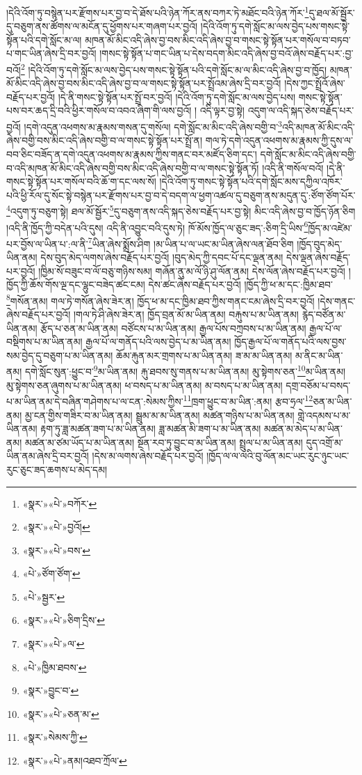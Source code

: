 །དེའི་འོག་ཏུ་བསྙེན་པར་རྫོགས་པར་བྱ་བ་དེ་ཐོས་པའི་ཉེན་ཀོར་ནས་བཀར་ཏེ་མཐོང་བའི་ཉེན་ཀོར་\footnote{«སྣར་»«པེ་»བཀོར་}དུ་ཐལ་མོ་སྦྱོར་དུ་བཅུག་ནས་ཚོགས་ལ་མངོན་དུ་ཕྱོགས་པར་གཞག་པར་བྱའོ། །དེའི་འོག་ཏུ་དགེ་སློང་མ་ལས་བྱེད་པས་གསང་སྟེ་སྟོན་པའི་དགེ་སློང་མ་ལ། མཁན་མོ་མིང་འདི་ཞེས་བྱ་བས་མིང་འདི་ཞེས་བྱ་བ་གསང་སྟེ་སྟོན་པར་གསོལ་བ་བཏབ་པ་གང་ཡིན་ཞེས་དྲི་བར་བྱའོ། །གསང་སྟེ་སྟོན་པ་གང་ཡིན་པ་དེས་བདག་མིང་འདི་ཞེས་བྱ་བའོ་ཞེས་བརྗོད་པར་:བྱ་བའོ།\footnote{«སྣར་»«པེ་»བྱའོ།} །དེའི་འོག་ཏུ་དགེ་སློང་མ་ལས་བྱེད་པས་གསང་སྟེ་སྟོན་པའི་དགེ་སློང་མ་ལ་མིང་འདི་ཞེས་བྱ་བ་ཁྱོད། མཁན་མོ་མིང་འདི་ཞེས་བྱ་བས་མིང་འདི་ཞེས་བྱ་བ་ལ་གསང་སྟེ་སྟོན་པར་སྤྲོའམ་ཞེས་དྲི་བར་བྱའོ། །དེས་ཀྱང་སྤྲོའོ་ཞེས་བརྗོད་པར་བྱའོ། །དེ་ནི་གསང་སྟེ་སྟོན་པར་སྤྲོ་བར་བྱའོ། །དེའི་འོག་ཏུ་དགེ་སློང་མ་ལས་བྱེད་པས། གསང་སྟེ་སྟོན་པས་བར་ཆད་དྲི་བའི་ཕྱིར་གསོལ་བ་འབའ་ཞིག་གི་ལས་བྱའོ། །
འདི་ལྟར་བྱ་སྟེ། འདུག་ལ་འདི་སྐད་ཅེས་བརྗོད་པར་བྱའོ། །དགེ་འདུན་འཕགས་མ་རྣམས་གསན་དུ་གསོལ། དགེ་སློང་མ་མིང་འདི་ཞེས་བགྱི་བ་\footnote{«སྣར་»«པེ་»བས་}འདི་མཁན་མོ་མིང་འདི་ཞེས་བགྱི་བས་མིང་འདི་ཞེས་བགྱི་བ་ལ་གསང་སྟེ་སྟོན་པར་སྤྲོ་ན། གལ་ཏེ་དགེ་འདུན་འཕགས་མ་རྣམས་ཀྱི་དུས་ལ་བབ་ཅིང་བཟོད་ན་དགེ་འདུན་འཕགས་མ་རྣམས་ཀྱིས་གནང་བར་མཛོད་ཅིག་དང་། དགེ་སློང་མ་མིང་འདི་ཞེས་བགྱི་བ་འདི་མཁན་མོ་མིང་འདི་ཞེས་བགྱི་བས་མིང་འདི་ཞེས་བགྱི་བ་ལ་གསང་སྟེ་སྟོན་ཏོ། །འདི་ནི་གསོལ་བའོ། །དེ་ནི་གསང་སྟེ་སྟོན་པར་གསོལ་བའི་ཆོ་ག་དང་ལས་སོ། །དེའི་འོག་ཏུ་གསང་སྟེ་སྟོན་པའི་དགེ་སློང་མས་དཀྱིལ་འཁོར་པའི་ཕྱི་རོལ་དུ་སོང་སྟེ་བསྙེན་པར་རྫོགས་པར་བྱ་བ་དེ་བདག་ལ་ཕྱག་འཚལ་དུ་བཅུག་ནས་མདུན་དུ་:ཙོག་ཙོག་པོར་\footnote{«པེ་»ཙོག་ཙོག་}འདུག་ཏུ་བཅུག་སྟེ། ཐལ་མོ་སྦྱོར་\footnote{«པེ་»སྦྱར་}དུ་བཅུག་ནས་འདི་སྐད་ཅེས་བརྗོད་པར་བྱ་སྟེ། མིང་འདི་ཞེས་བྱ་བ་ཁྱོད་ཉོན་ཅིག །འདི་ནི་ཁྱོད་ཀྱི་བདེན་པའི་དུས། འདི་ནི་འབྱུང་བའི་དུས་ཏེ། ཁོ་མོས་ཁྱོད་ལ་ཅུང་ཟད་:ཅིག་དྲི་ཡིས་\footnote{«སྣར་»«པེ་»ཅིག་དྲིས་}ཁྱོད་མ་འཛེམ་པར་བྱོས་ལ་ཡིན་པ་:ལ་ནི་\footnote{«སྣར་»«པེ་»ལ་}ཡིན་ཞེས་སྨྲོས་ཤིག །མ་ཡིན་པ་ལ་ཡང་མ་ཡིན་ཞེས་ལན་ཐོབ་ཅིག །ཁྱོད་བུད་མེད་ཡིན་ནམ། དེས་བུད་མེད་ལགས་ཞེས་བརྗོད་པར་བྱའོ། །བུད་མེད་ཀྱི་དབང་པོ་དང་ལྡན་ནམ། དེས་ལྡན་ཞེས་བརྗོད་པར་བྱའོ། །ཁྱིམ་སོ་བཟུང་བ་ལོ་བཅུ་གཉིས་སམ། གཞོན་ནུ་མ་ལོ་ཉི་ཤུ་ལོན་ནམ། དེས་ལོན་ཞེས་བརྗོད་པར་བྱའོ། །ཁྱོད་ཀྱི་ཆོས་གོས་ལྔ་དང་ལྷུང་བཟེད་ཚང་ངམ། དེས་ཚང་ཞེས་བརྗོད་པར་བྱའོ། །ཁྱོད་ཀྱི་ཕ་མ་དང་:ཁྱིམ་ཐབ་\footnote{«པེ་»ཁྱིམ་ཐབས་}གསོན་ནམ། གལ་ཏེ་གསོན་ཞེས་ཟེར་ན། ཁྱོད་ཕ་མ་དང་ཁྱིམ་ཐབ་ཀྱིས་གནང་ངམ་ཞེས་དྲི་བར་བྱའོ། །དེས་གནང་ཞེས་བརྗོད་པར་བྱའོ། །གལ་ཏེ་ཤི་ཞེས་ཟེར་ན། ཁྱོད་བྲན་མོ་མ་ཡིན་ནམ། བརྐུས་པ་མ་ཡིན་ནམ། རྙེད་བཙོན་མ་ཡིན་ནམ། རྩོད་པ་ཅན་མ་ཡིན་ནམ། བཙོངས་པ་མ་ཡིན་ནམ། རྒྱལ་པོས་བཀྲབས་པ་མ་ཡིན་ནམ། རྒྱལ་པོ་ལ་བསྡིགས་པ་མ་ཡིན་ནམ། རྒྱལ་པོ་ལ་གནོད་པའི་ལས་བྱེད་པ་མ་ཡིན་ནམ། ཁྱོད་རྒྱལ་པོ་ལ་གནོད་པའི་ལས་བྱས་སམ་བྱེད་དུ་བཅུག་པ་མ་ཡིན་ནམ། ཆོམ་རྐུན་མར་གྲགས་པ་མ་ཡིན་ནམ། ཟ་མ་མ་ཡིན་ནམ། མ་ནིང་མ་ཡིན་ནམ། དགེ་སློང་སུན་:ཕྱུང་བ་\footnote{«སྣར་»བྱུང་བ་}མ་ཡིན་ནམ། རྐུ་ཐབས་སུ་གནས་པ་མ་ཡིན་ནམ། མུ་སྟེགས་ཅན་\footnote{«སྣར་»«པེ་»ཅན་མ་}མ་ཡིན་ནམ། མུ་སྟེགས་ཅན་ཞུགས་པ་མ་ཡིན་ནམ། ཕ་བསད་པ་མ་ཡིན་ནམ། མ་བསད་པ་མ་ཡིན་ནམ། དགྲ་བཅོམ་པ་བསད་པ་མ་ཡིན་ནམ་དེ་བཞིན་གཤེགས་པ་ལ་ངན་:སེམས་ཀྱིས་\footnote{«སྣར་»སེམས་ཀྱི་}ཁྲག་ཕྱུང་བ་མ་ཡིན་:ནམ། རྩབ་ཧྲལ་\footnote{«སྣར་»«པེ་»ནམ།འཐབ་ཀྲོལ་}ཅན་མ་ཡིན་ནམ། མྱ་ངན་གྱིས་གཟིར་བ་མ་ཡིན་ནམ། སྦྲུམ་མ་མ་ཡིན་ནམ། མཚན་གཉིས་པ་མ་ཡིན་ནམ། གླེ་འདམས་པ་མ་ཡིན་ནམ། རྟག་ཏུ་ཟླ་མཚན་ཟག་པ་མ་ཡིན་ནམ། ཟླ་མཚན་མི་ཟག་པ་མ་ཡིན་ནམ། མཚན་མ་མེད་པ་མ་ཡིན་ནམ། མཚན་མ་ཙམ་ཡོད་པ་མ་ཡིན་ནམ། སྔོན་རབ་ཏུ་བྱུང་བ་མ་ཡིན་ནམ། སྤྲུལ་པ་མ་ཡིན་ནམ། དུད་འགྲོ་མ་ཡིན་ནམ་ཞེས་དྲི་བར་བྱའོ། །དེས་མ་ལགས་ཞེས་བརྗོད་པར་བྱའོ། །ཁྱོད་ལ་ལ་ལའི་བུ་ལོན་མང་ཡང་རུང་ཉུང་ཡང་རུང་ཅུང་ཟད་ཆགས་པ་མེད་དམ། 
